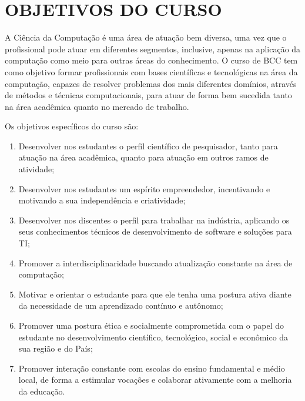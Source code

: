 \documentclass[
	12pt,				%
	openright,			%
  oneside,     %
	a4paper,			%
	chapter=TITLE,		%
	english,			%
	french,				%
	spanish,			%
	brazil				%
	]{abntex2}
\begin{document}
%
%


\chapter{OBJETIVOS DO CURSO}
\label{cap_objetivos_do_curso}

A Ciência da Computação é uma área de atuação bem diversa, uma vez que o profissional pode atuar em diferentes segmentos, inclusive, apenas na aplicação da computação como meio para outras áreas do conhecimento. O curso de BCC tem como objetivo formar profissionais com bases científicas e tecnológicas na área da computação, capazes de resolver problemas dos mais diferentes domínios, através de métodos e técnicas computacionais, para atuar de forma bem sucedida tanto na área acadêmica quanto no mercado de trabalho. 

Os objetivos específicos do curso são:

\begin{enumerate}
    \item Desenvolver nos estudantes o perfil científico de pesquisador, tanto para atuação na área acadêmica, quanto para atuação em outros ramos de atividade;
    \item Desenvolver nos estudantes um espírito empreendedor, incentivando e motivando a sua independência e criatividade;
    \item Desenvolver nos discentes o perfil para trabalhar na indústria, aplicando os seus conhecimentos técnicos de desenvolvimento de software e soluções para TI;
    \item Promover a interdisciplinaridade buscando atualização constante na área de computação;
    \item Motivar e orientar o estudante para que ele tenha uma postura ativa diante da necessidade de um aprendizado contínuo e autônomo;
    \item Promover uma postura ética e socialmente comprometida com o papel do estudante no desenvolvimento científico, tecnológico, social e econômico da sua região e do País;
    \item Promover interação constante com escolas do ensino fundamental e médio local, de forma a estimular vocações e colaborar ativamente com a melhoria da educação.
    
\end{enumerate}
\end{document}
